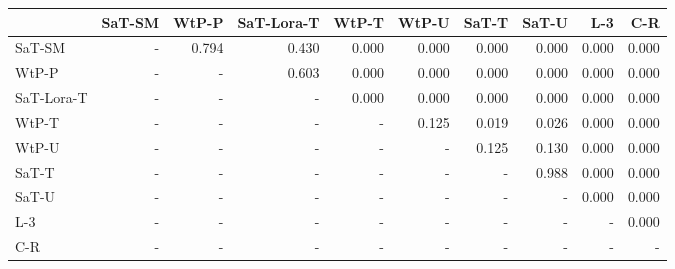 \begin{tabular}{lrrrrrrrrr}
\toprule
 & SaT-SM & WtP-P & SaT-Lora-T & WtP-T & WtP-U & SaT-T & SaT-U & L-3 & C-R \\
\midrule
SaT-SM & - & 0.794 & 0.430 & 0.000 & 0.000 & 0.000 & 0.000 & 0.000 & 0.000 \\
WtP-P & - & - & 0.603 & 0.000 & 0.000 & 0.000 & 0.000 & 0.000 & 0.000 \\
SaT-Lora-T & - & - & - & 0.000 & 0.000 & 0.000 & 0.000 & 0.000 & 0.000 \\
WtP-T & - & - & - & - & 0.125 & 0.019 & 0.026 & 0.000 & 0.000 \\
WtP-U & - & - & - & - & - & 0.125 & 0.130 & 0.000 & 0.000 \\
SaT-T & - & - & - & - & - & - & 0.988 & 0.000 & 0.000 \\
SaT-U & - & - & - & - & - & - & - & 0.000 & 0.000 \\
L-3 & - & - & - & - & - & - & - & - & 0.000 \\
C-R & - & - & - & - & - & - & - & - & - \\
\bottomrule
\end{tabular}


